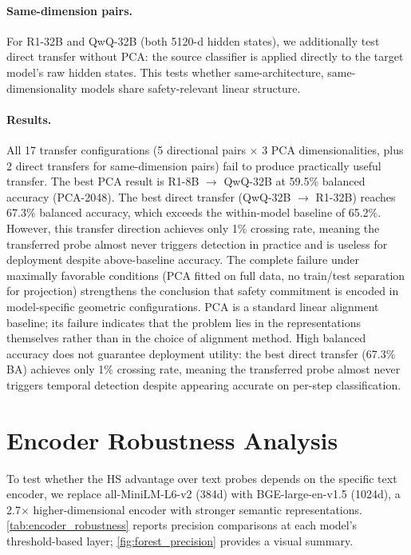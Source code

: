 \paragraph{Same-dimension pairs.} For R1-32B and QwQ-32B (both 5120-d hidden states), we additionally test direct transfer without PCA: the source classifier is applied directly to the target model's raw hidden states. This tests whether same-architecture, same-dimensionality models share safety-relevant linear structure.

\paragraph{Results.} All 17 transfer configurations (5 directional pairs $\times$ 3 PCA dimensionalities, plus 2 direct transfers for same-dimension pairs) fail to produce practically useful transfer. The best PCA result is R1-8B $\rightarrow$ QwQ-32B at 59.5\% balanced accuracy (PCA-2048). The best direct transfer (QwQ-32B $\rightarrow$ R1-32B) reaches 67.3\% balanced accuracy, which exceeds the within-model baseline of 65.2\%. However, this transfer direction achieves only 1\% crossing rate, meaning the transferred probe almost never triggers detection in practice and is useless for deployment despite above-baseline accuracy. The complete failure under maximally favorable conditions (PCA fitted on full data, no train/test separation for projection) strengthens the conclusion that safety commitment is encoded in model-specific geometric configurations. PCA is a standard linear alignment baseline; its failure indicates that the problem lies in the representations themselves rather than in the choice of alignment method. High balanced accuracy does not guarantee deployment utility: the best direct transfer (67.3\% BA) achieves only 1\% crossing rate, meaning the transferred probe almost never triggers temporal detection despite appearing accurate on per-step classification.


\section{Encoder Robustness Analysis}
\label{app:encoder_robustness}

To test whether the HS advantage over text probes depends on the specific text encoder, we replace all-MiniLM-L6-v2 (384d) with BGE-large-en-v1.5 (1024d), a 2.7$\times$ higher-dimensional encoder with stronger semantic representations. \cref{tab:encoder_robustness} reports precision comparisons at each model's threshold-based layer; \cref{fig:forest_precision} provides a visual summary.

